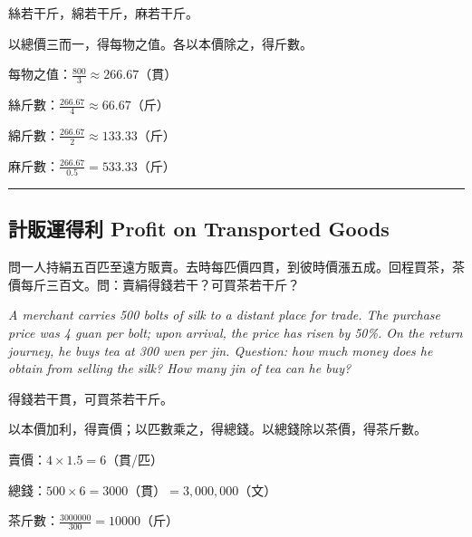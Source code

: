 \documentclass[11pt,a4paper]{article}
\newcommand{\longline}{\noindent\rule{\textwidth}{0.4pt}}
\begin{document}
\begin{answer}
絲若干斤，綿若干斤，麻若干斤。
\end{answer}

\begin{method}
以總價三而一，得每物之值。各以本價除之，得斤數。
\end{method}

\begin{working}
每物之值：$\displaystyle\frac{800}{3} \approx 266.67$（貫）

絲斤數：$\displaystyle\frac{266.67}{4} \approx 66.67$（斤）

綿斤數：$\displaystyle\frac{266.67}{2} \approx 133.33$（斤）

麻斤數：$\displaystyle\frac{266.67}{0.5} = 533.33$（斤）
\end{working}

\vspace{0.5em}
\longline

\subsection{計販運得利 \quad Profit on Transported Goods}

\begin{problem}
問一人持絹五百匹至遠方販賣。去時每匹價四貫，到彼時價漲五成。回程買茶，茶價每斤三百文。問：賣絹得錢若干？可買茶若干斤？

\textit{A merchant carries 500 bolts of silk to a distant place for trade. The purchase price was 4 guan per bolt; upon arrival, the price has risen by 50\%. On the return journey, he buys tea at 300 wen per jin. Question: how much money does he obtain from selling the silk? How many jin of tea can he buy?}
\end{problem}

\begin{answer}
得錢若干貫，可買茶若干斤。
\end{answer}

\begin{method}
以本價加利，得賣價；以匹數乘之，得總錢。以總錢除以茶價，得茶斤數。
\end{method}

\begin{working}
賣價：$4 \times 1.5 = 6$（貫/匹）

總錢：$500 \times 6 = 3000$（貫）$= 3{,}000{,}000$（文）

茶斤數：$\displaystyle\frac{3000000}{300} = 10000$（斤）
\end{working}
\end{document}
